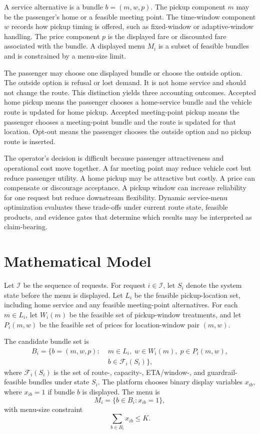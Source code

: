 \documentclass[a4paper,fleqn,review]{cas-dc}
\begin{document}
A service alternative is a bundle $b=(m,w,p)$. The pickup component $m$ may be
the passenger's home or a feasible meeting point. The time-window component
$w$ records how pickup timing is offered, such as fixed-window or
adaptive-window handling. The price component $p$ is the displayed fare or
discounted fare associated with the bundle. A displayed menu $M_i$ is a subset
of feasible bundles and is constrained by a menu-size limit.

The passenger may choose one displayed bundle or choose the outside option.
The outside option is refusal or lost demand. It is not home service and
should not change the route. This distinction yields three accounting
outcomes. Accepted home pickup means the passenger chooses a home-service
bundle and the vehicle route is updated for home pickup. Accepted
meeting-point pickup means the passenger chooses a meeting-point bundle and
the route is updated for that location. Opt-out means the passenger chooses
the outside option and no pickup route is inserted.

The operator's decision is difficult because passenger attractiveness and
operational cost move together. A far meeting point may reduce vehicle cost
but reduce passenger utility. A home pickup may be attractive but costly. A
price can compensate or discourage acceptance. A pickup window can increase
reliability for one request but reduce downstream flexibility. Dynamic
service-menu optimization evaluates these trade-offs under current route
state, feasible products, and evidence gates that determine which results may
be interpreted as claim-bearing.

\section{Mathematical Model}

Let $\mathcal{I}$ be the sequence of requests. For request $i\in\mathcal{I}$,
let $S_i$ denote the system state before the menu is displayed. Let $L_i$ be
the feasible pickup-location set, including home service and any feasible
meeting-point alternatives. For each $m\in L_i$, let $W_i(m)$ be the feasible
set of pickup-window treatments, and let $P_i(m,w)$ be the feasible set of
prices for location-window pair $(m,w)$.

The candidate bundle set is
\begin{align}
B_i=\{b=(m,w,p):\;&m\in L_i,\; w\in W_i(m),\; p\in P_i(m,w), \nonumber\\
& b\in \mathcal{F}_i(S_i)\},
\end{align}
where $\mathcal{F}_i(S_i)$ is the set of route-, capacity-, ETA/window-, and
guardrail-feasible bundles under state $S_i$.
The platform chooses binary display variables $x_{ib}$, where $x_{ib}=1$ if
bundle $b$ is displayed. The menu is
\begin{equation}
M_i = \{b\in B_i:x_{ib}=1\},
\end{equation}
with menu-size constraint
\begin{equation}
\sum_{b\in B_i}x_{ib}\le K.
\end{equation}
\end{document}
